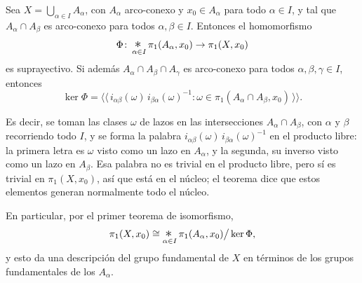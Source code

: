\documentclass[11pt]{article}
\begin{document}
\begin{teo}\label{teo:van-kampen}
Sea $X=\bigcup_{\alpha\in I}A_\alpha$, con $A_\alpha$ arco-conexo y $x_0\in A_\alpha$ para todo $\alpha\in I$, y tal que $A_\alpha\cap A_\beta$ es arco-conexo para todos $\alpha,\beta\in I$. Entonces el homomorfismo
\[
  \Phi\colon \mathop{\scalebox{1.4}{$*$}}_{\alpha\in I}\pi_1(A_\alpha,x_0)\to\pi_1(X,x_0)
\]
es suprayectivo. Si además $A_\alpha\cap A_\beta\cap A_\gamma$ es arco-conexo para todos $\alpha,\beta,\gamma\in I$, entonces
\[
  \ker\Phi=\bigl\langle\!\bigl\langle\, i_{\alpha\beta}(\omega)\,i_{\beta\alpha}(\omega)^{-1} : \omega\in\pi_1(A_\alpha\cap A_\beta,x_0)\,\bigr\rangle\!\bigr\rangle.
\]
\end{teo}

Es decir, se toman las clases $\omega$ de lazos en las intersecciones $A_\alpha\cap A_\beta$, con $\alpha$ y $\beta$ recorriendo todo $I$, y se forma la palabra $i_{\alpha\beta}(\omega)\,i_{\beta\alpha}(\omega)^{-1}$ en el producto libre: la primera letra es $\omega$ visto como un lazo en $A_\alpha$, y la segunda, su inverso visto como un lazo en $A_\beta$. Esa palabra no es trivial en el producto libre, pero sí es trivial en $\pi_1(X,x_0)$, así que está en el núcleo; el teorema dice que estos elementos generan normalmente todo el núcleo.

En particular, por el primer teorema de isomorfismo,
\[
  \pi_1(X,x_0)\cong \mathop{\scalebox{1.4}{$*$}}_{\alpha\in I}\pi_1(A_\alpha,x_0)\big/\ker\Phi,
\]
y esto da una descripción del grupo fundamental de $X$ en términos de los grupos fundamentales de los $A_\alpha$.

\begin{erratas}
\end{erratas}
\end{document}
